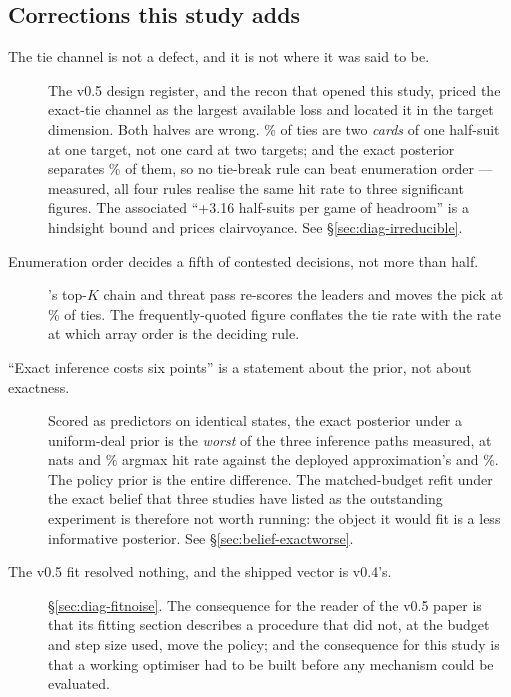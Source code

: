 \subsection{Corrections this study adds}
\label{sec:corr-self}

\begin{description}

\item[The tie channel is not a defect, and it is not where it was said to be.] The v0.5 design
  register, and the recon that opened this study, priced the exact-tie channel as the largest
  available loss and located it in the target dimension. Both halves are wrong.
  \vsixTieSameSuitFive\% of ties are two \emph{cards} of one half-suit at one target, not one card
  at two targets; and the exact posterior separates \vsixTieExactSepPctFive\% of them, so no
  tie-break rule can beat enumeration order --- measured, all four rules realise the same hit rate
  to three significant figures. The associated ``+3.16 half-suits per game of headroom'' is a
  hindsight bound and prices clairvoyance. See \S\ref{sec:diag-irreducible}.

\item[Enumeration order decides a fifth of contested decisions, not more than half.] \vfive{}'s
  top-$K$ chain and threat pass re-scores the leaders and moves the pick at
  \vsixTieShipMovedFive\% of ties. The frequently-quoted figure conflates the tie rate with the
  rate at which array order is the deciding rule.

\item[``Exact inference costs six points'' is a statement about the prior, not about exactness.]
  Scored as predictors on identical states, the exact posterior under a uniform-deal prior is the
  \emph{worst} of the three inference paths measured, at \vsixBeliefExactNLL{} nats and
  \vsixBeliefExactHit\% argmax hit rate against the deployed approximation's
  \vsixBeliefShippedNLL{} and \vsixBeliefShippedHit\%. The policy prior is the entire difference.
  The matched-budget refit under the exact belief that three studies have listed as the outstanding
  experiment is therefore not worth running: the object it would fit is a less informative
  posterior. See \S\ref{sec:belief-exactworse}.

\item[The v0.5 fit resolved nothing, and the shipped vector is v0.4's.] \S\ref{sec:diag-fitnoise}.
  The consequence for the reader of the v0.5 paper is that its fitting section describes a procedure
  that did not, at the budget and step size used, move the policy; and the consequence for this
  study is that a working optimiser had to be built before any mechanism could be evaluated.


\end{description}
